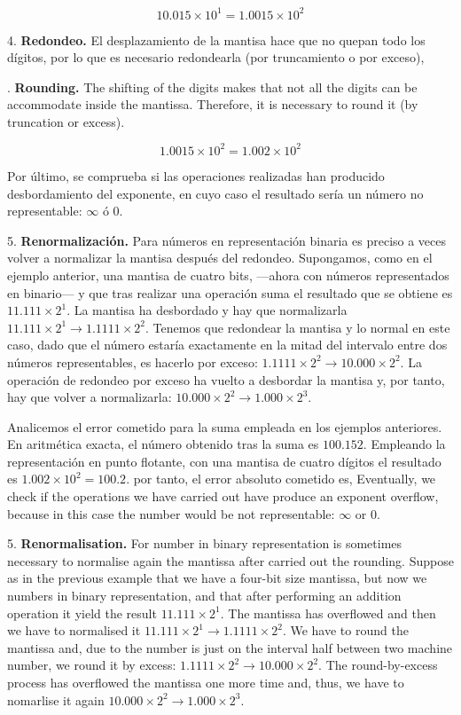 \begin{equation*}
10.015\times10^1=1.0015\times10^2
\end{equation*}

\begin{paracol}{2}
4. \textbf{Redondeo.} El desplazamiento de la mantisa hace que no quepan todo los dígitos, por lo que es necesario redondearla (por truncamiento o por exceso),

. \textbf{Rounding.} The shifting of the digits makes that not all the digits can be accommodate inside the mantissa. Therefore, it is necessary to round it (by truncation or excess).   
\end{paracol}
\begin{equation*}
1.0015\times10^2=1.002\times10^2
\end{equation*}
\begin{paracol}{2}
Por último, se comprueba si las operaciones realizadas han producido desbordamiento del exponente, en cuyo caso el resultado sería un número no representable: $\infty$ ó $0$.

5. \textbf{Renormalización.} Para números en representación binaria es preciso a veces volver a normalizar la mantisa después del redondeo. Supongamos, como en el ejemplo anterior, una mantisa de cuatro bits, ---ahora con números representados en binario--- y que tras realizar una operación suma el resultado que se obtiene es $11.111\times2^1$. La mantisa ha desbordado y hay que normalizarla $11.111\times2^1\rightarrow1.1111\times2^2$. Tenemos que redondear la mantisa y lo normal en este caso, dado que el número estaría exactamente en la mitad del intervalo entre dos números representables, es hacerlo por exceso: $1.1111\times2^2\rightarrow10.000\times2^2$. La operación de redondeo por exceso ha vuelto a desbordar la mantisa y, por tanto, hay que volver a normalizarla: $10.000\times2^2\rightarrow1.000\times2^3$.

Analicemos el error cometido para la suma empleada en los ejemplos anteriores. En aritmética exacta, el número obtenido tras la suma es $100.152$. Empleando la representación en punto flotante, con una mantisa de cuatro dígitos el resultado es $1.002\times10^2=100.2$. por tanto, el error absoluto cometido es,
\switchcolumn	
Eventually, we check if the operations we have carried out have produce an exponent overflow, because in this case the number would be not representable: $\infty$ or $0$.  

5. \textbf{Renormalisation.} For number in binary representation is sometimes necessary to normalise again the mantissa after carried out the rounding. Suppose as in the previous example that we have a four-bit size mantissa, but now we numbers in binary representation, and that after performing an addition operation it yield the result $11.111\times2^1$. The mantissa has overflowed and then we have to normalised it $11.111\times2^1\rightarrow1.1111\times2^2$. We have to round the mantissa and, due to the number is just on the interval half between two machine number, we round it by excess: $1.1111\times2^2\rightarrow10.000\times2^2$. The round-by-excess process has overflowed the mantissa one more time and, thus, we have to nomarlise it again $10.000\times2^2\rightarrow1.000\times2^3$.


\end{paracol}
